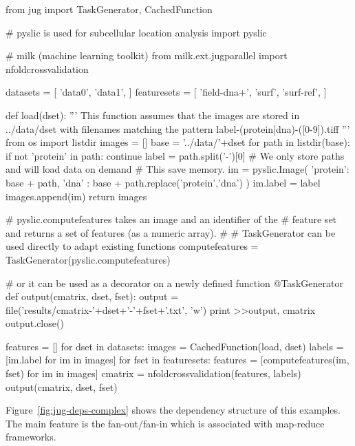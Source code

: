 \documentclass{article}
\begin{document}
\begin{python}
from jug import TaskGenerator, CachedFunction

# pyslic is used for subcellular location analysis
import pyslic

# milk (machine learning toolkit)
from milk.ext.jugparallel import nfoldcrossvalidation

datasets = [ 'data0', 'data1', ]
featuresets = [ 'field-dna+', 'surf', 'surf-ref', ]

def load(dset):
    '''
    This function assumes that the images are stored in
    ../data/dset with filenames matching the pattern
    label-(protein|dna)-([0-9]).tiff
    '''
    from os import listdir
    images = []
    base = '../data/'+dset
    for path in listdir(base):
        if not 'protein' in path: continue
        label = path.split('-')[0]
        # We only store paths and will load data on demand
        # This save memory.
        im = pyslic.Image({
                'protein': base + path,
                'dna' : base + path.replace('protein','dna')
                })
        im.label = label
        images.append(im)
    return images

# pyslic.computefeatures takes an image and an identifier of the
# feature set and returns a set of features (as a numeric array).
#
# TaskGenerator can be used directly to adapt existing functions
computefeatures = TaskGenerator(pyslic.computefeatures)

# or it can be used as a decorator on a newly defined function
@TaskGenerator
def output(cmatrix, dset, fset):
    output = file('results/cmatrix-'+dset+'-'+fset+'.txt', 'w')
    print >>output, cmatrix
    output.close()

features = []
for dset in datasets:
    images = CachedFunction(load, dset)
    labels = [im.label for im in images]
    for fset in featuresets:
        features = [computefeatures(im, fset) for im in images]
        cmatrix = nfoldcrossvalidation(features, labels)
        output(cmatrix, dset, fset)
\end{python}

Figure~\ref{fig:jug-deps-complex} shows the dependency structure of this
examples. The main feature is the fan-out/fan-in which is associated with
map-reduce frameworks.
\end{document}
